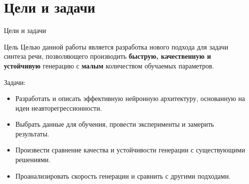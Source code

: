 

\section{Цели и задачи}

\begin{frame}{Цели и задачи}
\begin{block}{Цель}
    Целью данной работы является разработка нового подхода для задачи синтеза речи, позволяющего производить \textbf{быструю, качественную и устойчивую} генерацию с \textbf{малым} количеством обучаемых параметров.
\end{block}
\vspace{0.4cm}
Задачи:
\begin{itemize}
    \item Разработать и описать эффективную нейронную архитектуру, основанную на идеи неавторегрессионности.
    \item Выбрать данные для обучения, провести эксперименты и замерить результаты.
    \item Произвести сравнение качества и устойчивости генерации с существующими решениями.
    \item Проанализировать скорость генерации и сравнить с другими подходами.
\end{itemize}
\end{frame}

